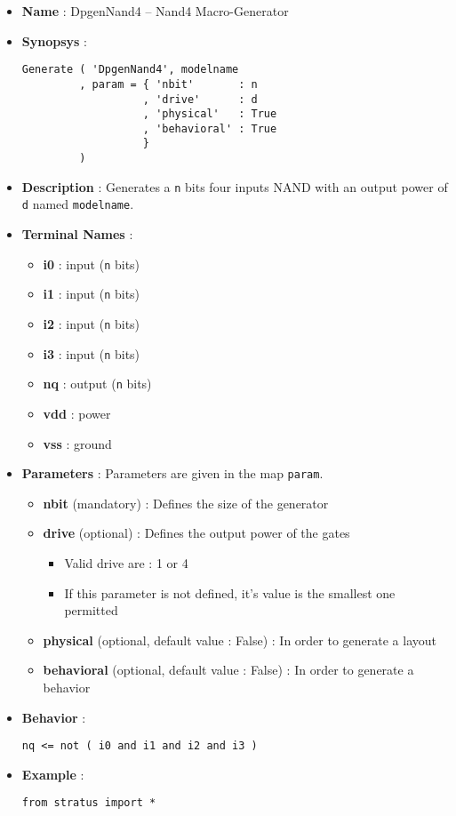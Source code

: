 \begin{itemize}
    \item \textbf{Name} : DpgenNand4 -- Nand4 Macro-Generator
    \item \textbf{Synopsys} :
\begin{verbatim}
Generate ( 'DpgenNand4', modelname
         , param = { 'nbit'       : n
                   , 'drive'      : d
                   , 'physical'   : True
                   , 'behavioral' : True                   
                   }
         )
\end{verbatim}
    \item \textbf{Description} : Generates a \verb-n- bits four inputs NAND with an output power of \verb-d- named \verb-modelname-.
    \item \textbf{Terminal Names} :
    \begin{itemize}
        \item \textbf{i0} : input (\verb-n- bits)
        \item \textbf{i1} : input (\verb-n- bits)
        \item \textbf{i2} : input (\verb-n- bits)
        \item \textbf{i3} : input (\verb-n- bits)
        \item \textbf{nq} : output (\verb-n- bits)
        \item \textbf{vdd} : power
        \item \textbf{vss} : ground
    \end{itemize}
    \item \textbf{Parameters} : Parameters are given in the map \verb-param-.
    \begin{itemize}
        \item \textbf{nbit} (mandatory) : Defines the size of the generator
        \item \textbf{drive} (optional) : Defines the output power of the gates
        \begin{itemize}
            \item Valid drive are : 1 or 4
            \item If this parameter is not defined, it's value is the smallest one permitted
        \end{itemize}
        \item \textbf{physical} (optional, default value : False) : In order to generate a layout
        \item \textbf{behavioral} (optional, default value : False) : In order to generate a behavior        
    \end{itemize}
    \item \textbf{Behavior} :
\begin{verbatim}
nq <= not ( i0 and i1 and i2 and i3 )
\end{verbatim}
    \item \textbf{Example} :
\begin{verbatim}
from stratus import *


\end{verbatim}
\end{itemize}
